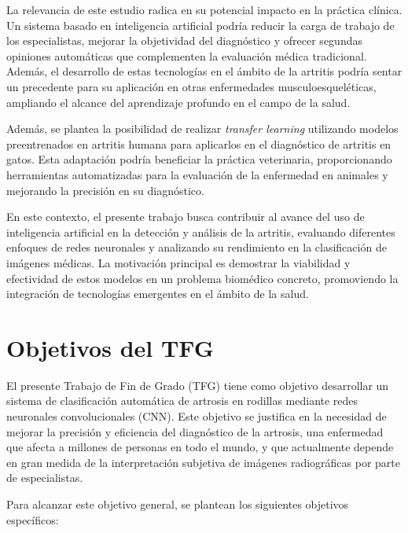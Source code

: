 \documentclass[11pt,spanish,listoffigures,listoftables]{tfgetsinf}
\begin{document}
La relevancia de este estudio radica en su potencial impacto en la práctica clínica. Un sistema basado en inteligencia artificial podría reducir la carga de trabajo de los especialistas, mejorar la objetividad del diagnóstico y ofrecer segundas opiniones automáticas que complementen la evaluación médica tradicional. Además, el desarrollo de estas tecnologías en el ámbito de la artritis podría sentar un precedente para su aplicación en otras enfermedades musculoesqueléticas, ampliando el alcance del aprendizaje profundo en el campo de la salud.

Además, se plantea la posibilidad de realizar \textit{transfer learning} utilizando modelos preentrenados en artritis humana para aplicarlos en el diagnóstico de artritis en gatos. Esta adaptación podría beneficiar la práctica veterinaria, proporcionando herramientas automatizadas para la evaluación de la enfermedad en animales y mejorando la precisión en su diagnóstico.

En este contexto, el presente trabajo busca contribuir al avance del uso de inteligencia artificial en la detección y análisis de la artritis, evaluando diferentes enfoques de redes neuronales y analizando su rendimiento en la clasificación de imágenes médicas. La motivación principal es demostrar la viabilidad y efectividad de estos modelos en un problema biomédico concreto, promoviendo la integración de tecnologías emergentes en el ámbito de la salud.



\section{Objetivos del TFG}

El presente Trabajo de Fin de Grado (TFG) tiene como objetivo desarrollar un sistema de clasificación automática de artrosis en rodillas mediante redes neuronales convolucionales (CNN). Este objetivo se justifica en la necesidad de mejorar la precisión y eficiencia del diagnóstico de la artrosis, una enfermedad que afecta a millones de personas en todo el mundo, y que actualmente depende en gran medida de la interpretación subjetiva de imágenes radiográficas por parte de especialistas.

Para alcanzar este objetivo general, se plantean los siguientes objetivos específicos:
\end{document}
